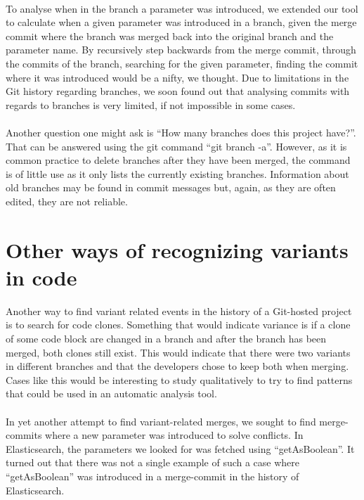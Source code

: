 \paragraph*{}
To analyse when in the branch a parameter was introduced, we extended our tool to calculate when a given parameter was introduced in a branch, given the merge commit where the branch was merged back into the original branch and the parameter name. By recursively step backwards from the merge commit, through the commits of the branch, searching for the given parameter, finding the commit where it was introduced would be a nifty, we thought. Due to limitations in the Git history regarding branches, we soon found out that analysing commits with regards to branches is very limited, if not impossible in some cases.
\paragraph*{}
Another question one might ask is “How many branches does this project have?”. That can be answered using the git command “git branch -a”. However, as it is common practice to delete branches after they have been merged, the command is of little use as it only lists the currently existing branches. Information about old branches may be found in commit messages but, again, as they are often edited, they are not reliable.
\section{Other ways of recognizing variants in code}
Another way to find variant related events in the history of a Git-hosted project is to search for code clones. Something that would indicate variance is if a clone of some code block are changed in a branch and after the branch has been merged, both clones still exist. This would indicate that there were two variants in different branches and that the developers chose to keep both when merging. Cases like this would be interesting to study qualitatively to try to find patterns that could be used in an automatic analysis tool.
\paragraph*{}
In yet another attempt to find variant-related merges, we sought to find merge-commits where a new parameter was introduced to solve conflicts. In Elasticsearch, the parameters we looked for was fetched using “getAsBoolean”. It turned out that there was not a single example of such a case where “getAsBoolean” was introduced in a merge-commit in the history of Elasticsearch.
